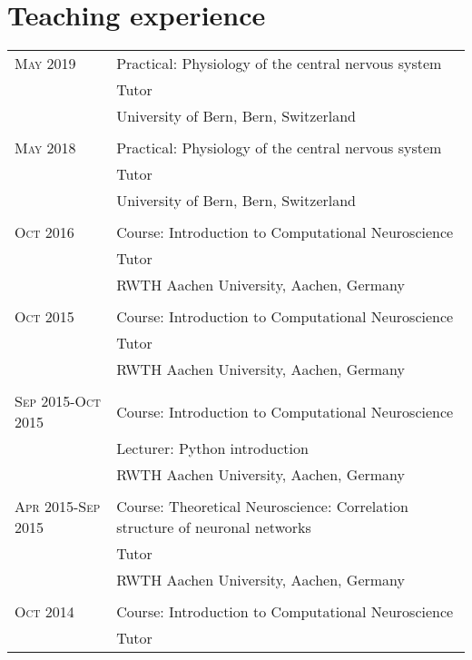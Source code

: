 \section{Teaching experience}
\begin{longtable}{>{\hfill}p{3.3cm}|p{12.0cm}}
  \textsc{May} 2019 & Practical: Physiology of the central nervous system \\
  & \footnotesize Tutor \\
  & \footnotesize University of Bern, Bern, Switzerland \\
  \multicolumn{2}{c}{} \\
  \textsc{May} 2018 & Practical: Physiology of the central nervous system \\
  & \footnotesize Tutor \\
  & \footnotesize University of Bern, Bern, Switzerland \\
  \multicolumn{2}{c}{} \\
  \textsc{Oct} 2016 & Course: Introduction to Computational Neuroscience \\
  & \footnotesize Tutor  \\
  & \footnotesize RWTH Aachen University, Aachen, Germany \\
  \multicolumn{2}{c}{} \\
  \textsc{Oct} 2015 & Course: Introduction to Computational Neuroscience \\
  & \footnotesize Tutor \\
  & \footnotesize RWTH Aachen University, Aachen, Germany \\
  \multicolumn{2}{c}{} \\
  \textsc{Sep} 2015-\textsc{Oct} 2015 & Course: Introduction to Computational Neuroscience \\
  & \footnotesize Lecturer: Python introduction \\
  & \footnotesize RWTH Aachen University, Aachen, Germany \\
  \multicolumn{2}{c}{} \\
  \textsc{Apr} 2015-\textsc{Sep} 2015 & Course: Theoretical Neuroscience: Correlation structure of neuronal networks \\ 
  & \footnotesize Tutor \\
  & \footnotesize RWTH Aachen University, Aachen, Germany \\
  \multicolumn{2}{c}{} \\
  \textsc{Oct} 2014 & Course: Introduction to Computational Neuroscience \\
  & \footnotesize Tutor \\

\end{longtable}
